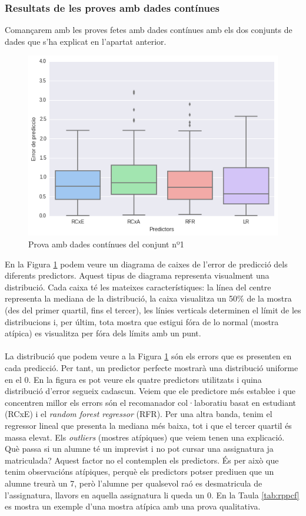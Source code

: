 \documentclass[12pt,a4paper,catalan]{article}
\begin{document}
\subsubsection{Resultats de les proves amb dades contínues}
Comançarem amb les proves fetes amb dades contínues amb els dos conjunts de dades que s'ha explicat en l'apartat anterior.
\\
\begin{figure}[h]
\centering
\includegraphics[width=.7\linewidth]{img/boxplot_primer_segon.png}
\caption{Prova amb dades contínues del conjunt nº1}
\label{fig:boxplotdctp}
\end{figure}

En la Figura \ref{fig:boxplotdctp} podem veure un diagrama de caixes de l'error de predicció dels diferents predictors. Aquest tipus de diagrama representa visualment una distribució. Cada caixa té les mateixes característiques: la línea del centre representa la mediana de la distribució, la caixa visualitza un 50\% de la mostra (des del primer quartil, fins el tercer), les línies verticals determinen el límit de les distribucions i, per últim, tota mostra que estigui fóra de lo normal (mostra atípica) es visualitza per fóra dels límits amb un punt.
\\
\\
La distribució que podem veure a la Figura \ref{fig:boxplotdctp} són els errors que es presenten en cada predicció. Per tant, un predictor perfecte mostrarà una distribució uniforme en el 0. En la figura es pot veure els quatre predictors utilitzats i quina distribució d'error segueix cadascun. Veiem que ele predictore més establee i que concentren millor els errors són el recomanador col·laboratiu basat en estudiant (RCxE) i el \textit{random forest regressor} (RFR). Per una altra banda, tenim el regressor lineal que presenta la mediana més baixa, tot i que el tercer quartil és massa elevat. Els \textit{outliers} (mostres atípiques) que veiem tenen una explicació. Què passa si un alumne té un imprevist i no pot cursar una assignatura ja matriculada? Aquest factor no el contemplen els predictors. És per això que tenim observacións atípiques, perquè els predictors potser prediuen que un alumne treurà un 7, però l'alumne per qualsevol raó es desmatricula de l'assignatura, llavors en aquella assignatura li queda un 0. En la Taula \ref{tab:rppcf} es mostra un exemple d'una mostra atípica amb una prova qualitativa.
\end{document}
